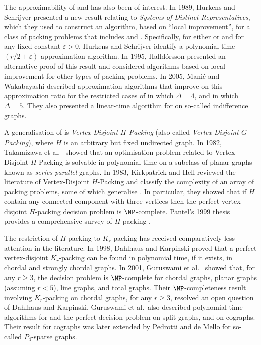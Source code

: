 The approximability of \vdkthree and \edkthree has also been of interest. In 1989, Hurkens and Schrijver \cite{hs89} presented a new result relating to \emph{Systems of Distinct Representatives}, which they used to construct an algorithm, based on ``local improvement'', for a class of packing problems that includes \vdkr and \edkr. Specifically, for either \vdkr or \edkr and for any fixed constant $\varepsilon > 0$, Hurkens and Schrijver identify a polynomial-time $(r/2 + \varepsilon)$-approximation algorithm. In 1995, Halld\'{o}rsson \cite{Hal95} presented an alternative proof of this result and considered algorithms based on local improvement for other types of packing problems. In 2005, Mani\'c and Wakabayashi \cite{Eurocomb05} described approximation algorithms that improve on this approximation ratio for the restricted cases of \vdkthree in which $\Delta=4$, and \edkthree in which $\Delta=5$. They also presented a linear-time algorithm for \vdkthree on so-called indifference graphs.

A generalisation of \vdkr is \emph{Vertex-Disjoint $H$-Packing} (also called \emph{Vertex-Disjoint $G$-Packing}), where $H$ is an arbitrary but fixed undirected graph. In 1982, Takamizawa et al.\ \cite{takamizawa1982linear} showed that an optimisation problem related to Vertex-Disjoint $H$-Packing is solvable in polynomial time on a subclass of planar graphs known as \emph{series-parallel} graphs. In 1983, Kirkpatrick and Hell \cite{KH83} reviewed the literature of Vertex-Disjoint $H$-Packing and classify the complexity of an array of packing problems, some of which generalise \vdkr. In particular, they showed that if $H$ contain any connected component with three vertices then the perfect vertex-disjoint $H$-packing decision problem is $\NP$-complete. Pantel's 1999 thesis provides a comprehensive survey of $H$-packing \cite{Pantel99}.

The restriction of $H$-packing to $K_r$-packing has received comparatively less attention in the literature. In 1998, Dahlhaus and Karpinski \cite{DAHLHAUS199879} proved that a perfect vertex-disjoint $K_r$-packing can be found in polynomial time, if it exists, in chordal and strongly chordal graphs. In 2001, Guruswami et al.\ \cite{guruswami_k_2001} showed that, for any $r \geq 3$, the \vdkr decision problem is $\NP$-complete for chordal graphs, planar graphs (assuming $r<5$), line graphs, and total graphs. Their $\NP$-completeness result involving $K_r$-packing on chordal graphs, for any $r \geq 3$, resolved an open question of Dahlhaus and Karpinski. Guruswami et al.\ also described polynomial-time algorithms for \vdkthree and the perfect \vdkr decision problem on split graphs, and \vdkr on cographs. Their result for cographs was later extended by Pedrotti and de Mello \cite{KrPackingP4sparse} for so-called $P_4$-sparse graphs.

